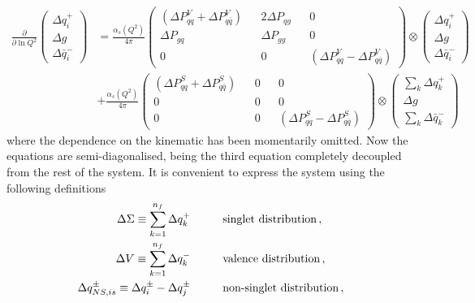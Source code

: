 \begin{equation}
  \begin{split}
    \frac{\partial}{\partial \ln Q^2} 
    \left(\begin{matrix}
      \Delta q_i^{+} \\
      \Delta g \\
      \Delta \bar{q}_i^{-}
    \end{matrix} \right) & = \frac{\alpha_{s}(Q^2)}{4 \pi} 
    \left(\begin{matrix}
      (\Delta P_{qq}^{V} + \Delta P_{q\bar{q}}^{V}) && 2 \Delta P_{qg} && 0 \\
      \Delta P_{gq} && \Delta P_{gg} && 0 \\
      0 && 0 && (\Delta P_{qq}^{V} - \Delta P_{q\bar{q}}^{V})
    \end{matrix} \right) \otimes
    \left(\begin{matrix}
      \Delta q_i^{+} \\
      \Delta g \\
      \Delta \bar{q}_i^{-}
    \end{matrix} \right) 
    \\[10pt]
    & + \frac{\alpha_{s}(Q^2)}{4 \pi}
    \left(\begin{matrix}
      (\Delta P_{qq}^{S} + \Delta P_{q \bar{q}}^{S}) && 0 && 0 \\
      0 && 0 && 0 \\
      0 && 0 && (\Delta P_{qq}^{S} - \Delta P_{q\bar{q}}^{S})
    \end{matrix} \right) 
    \otimes
    \left(\begin{matrix}
      \sum_{k} \Delta q_k^{+} \\
      \Delta g \\
      \sum_{k} \Delta \bar{q}_k^{-}
    \end{matrix} \right)
  \end{split}
\end{equation}
where the dependence on the kinematic has been momentarily omitted. Now the equations are semi-diagonalised, being the third equation completely decoupled from the rest of the system. It is convenient to express the system using the following definitions
\begin{equation}
  \begin{split}
     \Delta \Sigma \equiv \sum_{k=1}^{n_{f}} \Delta q_{k}^{+}  \hspace{10mm} & \T{singlet distribution}\, ,\\
     \Delta V \equiv \sum_{k=1}^{n_{f}} \Delta q_{k}^{-}  \hspace{10mm} & \T{valence distribution}\,, \\
     \Delta q_{NS,is}^{\pm} \equiv \Delta q_{i}^{\pm} - \Delta q_{j}^{\pm} \hspace{10mm} & \T{non-singlet distribution} \,,
  \end{split}
  \label{eq:evb_dist}
\end{equation}

